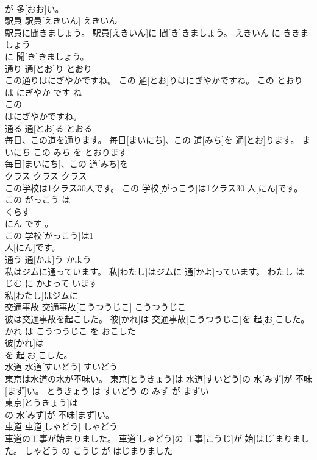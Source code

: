 \documentclass[8pt]{extreport}
\begin{document}
\begin{CJK}{UTF8}{min}
\\	が 多[おお]い。			
\\	駅員	駅員[えきいん]	えきいん	
\\	駅員に聞きましょう。	駅員[えきいん]に 聞[き]きましょう。	えきいん に ききましょう	
\\	に 聞[き]きましょう。			
\\	通り	通[とお]り	とおり	
\\	この通りはにぎやかですね。	この 通[とお]りはにぎやかですね。	この とおり は にぎやか です ね	
\\	この
\\	はにぎやかですね。			
\\	通る	通[とお]る	とおる	
\\	毎日、この道を通ります。	毎日[まいにち]、この 道[みち]を 通[とお]ります。	まいにち この みち を とおります	
\\	毎日[まいにち]、この 道[みち]を
\\	クラス	クラス	クラス	
\\	この学校は1クラス30人です。	この 学校[がっこう]は1クラス30 人[にん]です。	この がっこう は 
\\	くらす 
\\	にん です 。	
\\	この 学校[がっこう]は1
\\	人[にん]です。			
\\	通う	通[かよ]う	かよう	
\\	私はジムに通っています。	私[わたし]はジムに 通[かよ]っています。	わたし は じむ に かよって います	
\\	私[わたし]はジムに
\\	交通事故	交通事故[こうつうじこ]	こうつうじこ	
\\	彼は交通事故を起こした。	彼[かれ]は 交通事故[こうつうじこ]を 起[お]こした。	かれ は こうつうじこ を おこした	
\\	彼[かれ]は
\\	を 起[お]こした。			
\\	水道	水道[すいどう]	すいどう	
\\	東京は水道の水が不味い。	東京[とうきょう]は 水道[すいどう]の 水[みず]が 不味[まず]い。	とうきょう は すいどう の みず が まずい	
\\	東京[とうきょう]は
\\	の 水[みず]が 不味[まず]い。			
\\	車道	車道[しゃどう]	しゃどう	
\\	車道の工事が始まりました。	車道[しゃどう]の 工事[こうじ]が 始[はじ]まりました。	しゃどう の こうじ が はじまりました	

\end{CJK}
\end{document}
